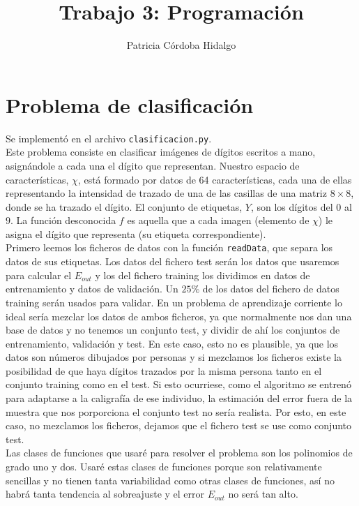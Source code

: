 \documentclass{article}
\begin{document}
\title{Trabajo 3: Programación}
\author{Patricia Córdoba Hidalgo}
\date{}
\maketitle

\tableofcontents

\section{Problema de clasificación}

Se implementó en el archivo \texttt{clasificacion.py}.\\

Este problema consiste en clasificar imágenes de dígitos escritos a mano, asignándole a cada una el dígito que representan. Nuestro espacio de características, $\chi$, está formado por datos de 64 características, cada una de ellas representando la intensidad de trazado de una de las casillas de una matriz $8 \times 8$, donde se ha trazado el dígito. El conjunto de etiquetas, $Y$, son los dígitos del $0$ al $9$. La función desconocida $f$ es aquella que a cada imagen (elemento de $\chi$) le asigna el dígito que representa (su etiqueta correspondiente).\\

Primero leemos los ficheros de datos con la función \texttt{readData}, que separa los datos de sus etiquetas. Los datos del fichero test serán los datos que usaremos para calcular el $E_{out}$ y los del fichero training los dividimos en datos de entrenamiento y datos de validación. Un $25\%$ de los datos del fichero de datos training serán usados para validar. En un problema de aprendizaje corriente lo ideal sería mezclar los datos de ambos ficheros, ya que normalmente nos dan una base de datos y no tenemos un conjunto test, y dividir de ahí los conjuntos de entrenamiento, validación y test. En este caso, esto no es plausible, ya que los datos son números dibujados por personas y si mezclamos los ficheros existe la posibilidad de que haya dígitos trazados por la misma persona tanto en el conjunto training como en el test. Si esto ocurriese, como el algoritmo se entrenó para adaptarse a la caligrafía de ese individuo, la estimación del error fuera de la muestra que nos porporciona el conjunto test no sería realista. Por esto, en este caso, no mezclamos los ficheros, dejamos que el fichero test se use como conjunto test.\\

Las clases de funciones que usaré para resolver el problema son los polinomios de grado uno y dos. Usaré estas clases de funciones porque son relativamente sencillas y no tienen tanta variabilidad como otras clases de funciones, así no habrá tanta tendencia al sobreajuste y el error $E_{out}$ no será tan alto.\\
\end{document}
